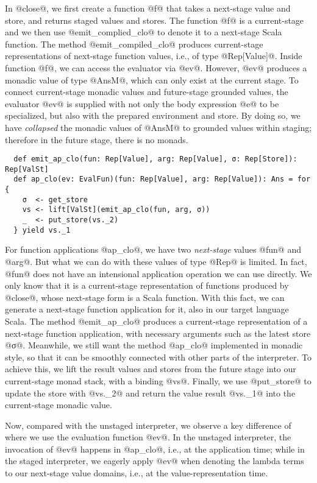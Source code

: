 In @close@, we first create a function @f@ that takes a next-stage value and
store, and returns staged values and stores. The function @f@ is a
current-stage and we then use @emit_complied_clo@ to denote it to a next-stage
Scala function.
The method @emit_compiled_clo@ produces current-stage representations of
next-stage function values, i.e., of type @Rep[Value]@.
Inside function @f@, we can access the evaluator via @ev@.
However, @ev@ produces a monadic value of type @AnsM@, which can only exist at
the current stage. To connect current-stage monadic values and future-stage
grounded values, the evaluator @ev@ is supplied with not only the body
expression @e@ to be specialized, but also with the prepared environment and
store.  By doing so, we have \textit{collapsed} the monadic values of @AnsM@ to
grounded values within staging; therefore in the future stage, there is no
monads.
\begin{lstlisting}
  def emit_ap_clo(fun: Rep[Value], arg: Rep[Value], σ: Rep[Store]): Rep[ValSt]
  def ap_clo(ev: EvalFun)(fun: Rep[Value], arg: Rep[Value]): Ans = for {
    σ  <- get_store
    vs <- lift[ValSt](emit_ap_clo(fun, arg, σ))
    _  <- put_store(vs._2)
  } yield vs._1
\end{lstlisting}

For function applications @ap_clo@, we have two \textit{next-stage} values @fun@
and @arg@. But what we can do with these values of type @Rep@ is limited. 
In fact, @fun@ does not have an intensional application operation we can use
directly. We only know that it is a current-stage representation of functions produced by @close@,
whose next-stage form is a Scala function.
With this fact, we can generate a next-stage function application for it, also
in our target language Scala. The method @emit_ap_clo@ produces a current-stage
representation of a next-stage function application, with necessary arguments
such as the latest store @σ@. Meanwhile, we still want the method @ap_clo@
implemented in monadic style, so that it can be smoothly connected with other
parts of the interpreter.  To achieve this, we lift the result values and
stores from the future stage into our current-stage monad stack, with a binding
@vs@.  Finally, we use @put_store@ to update the store with @vs._2@ and return
the value result @vs._1@ into the current-stage monadic value.

Now, compared with the unstaged interpreter, we observe a key difference of where
we use the evaluation function @ev@.  In the unstaged interpreter, the
invocation of @ev@ happens in @ap_clo@, i.e., at the application time; while in
the staged interpreter, we eagerly apply @ev@ when denoting the lambda terms to
our next-stage value domains, i.e., at the value-representation time.


